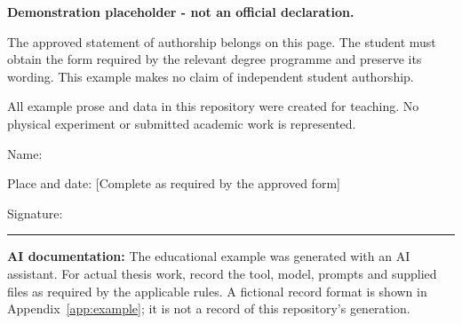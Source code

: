 \textbf{Demonstration placeholder - not an official declaration.}

The approved statement of authorship belongs on this page. The student must
obtain the form required by the relevant degree programme and preserve its wording.
This example makes no claim of independent student authorship.

All example prose and data in this repository were created for teaching.
No physical experiment or submitted academic work is represented.

\vspace{2cm}
Name: \StudentName\par
Place and date: [Complete as required by the approved form]\par
\vspace{1cm}
Signature: \rule{7cm}{0.4pt}

\textbf{AI documentation:} The educational example was generated with an AI
assistant. For actual thesis work, record the tool, model, prompts and supplied
files as required by the applicable rules. A fictional record format is shown
in Appendix~\ref{app:example}; it is not a record of this repository's generation.
